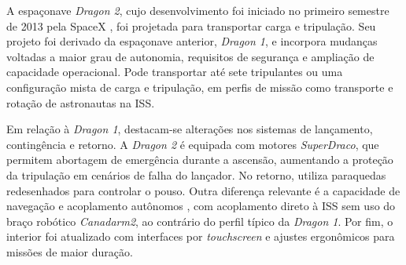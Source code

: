 


A espaçonave \emph{Dragon 2}, cujo desenvolvimento foi iniciado no primeiro semestre de 2013 pela SpaceX \cite{spaceDragonAlien}, foi projetada para transportar carga e tripulação.
Seu projeto foi derivado da espaçonave anterior, \emph{Dragon 1}, e incorpora mudanças voltadas a maior grau de autonomia, requisitos de segurança e ampliação de capacidade operacional.
Pode transportar até sete tripulantes ou uma configuração mista de carga e tripulação, em perfis de missão como transporte e rotação de astronautas na ISS.

Em relação à \emph{Dragon 1}, destacam-se alterações nos sistemas de lançamento, contingência e retorno. A \emph{Dragon 2} é equipada com motores \emph{SuperDraco}, que permitem abortagem de emergência durante a ascensão, aumentando a proteção da tripulação em cenários de falha do lançador. No retorno, utiliza paraquedas redesenhados para controlar o pouso.
Outra diferença relevante é a capacidade de navegação e acoplamento autônomos \cite{nasaStarshipDocking}, com acoplamento direto à ISS sem uso do braço robótico \emph{Canadarm2}, ao contrário do perfil típico da \emph{Dragon 1}.
Por fim, o interior foi atualizado com interfaces por \emph{touchscreen} e ajustes ergonômicos para missões de maior duração.
